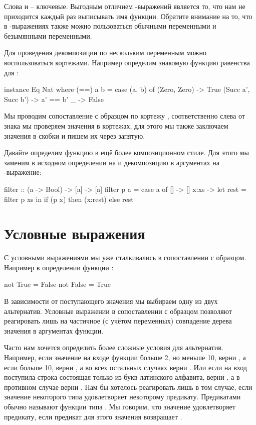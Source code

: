 Слова  и  -- ключевые. Выгодным отличием
-выражений является то, что нам не приходится
каждый раз выписывать имя функции. Обратите внимание
на то, что в -выражениях также можно пользоваться
обычными переменными и безымянными переменными.

Для проведения декомпозиции по нескольким переменным можно
воспользоваться кортежами. 
Например определим знакомую функцию равенства для :

\begin{code}
instance Eq Nat where
    (==) a b =
        case (a, b) of
            (Zero,    Zero)     -> True
            (Succ a', Succ b')  -> a' == b'
            _                   -> False
\end{code}

Мы проводим сопоставление с образцом по кортежу ,
соответственно слева от знака \In{->} мы проверяем значения в 
кортежах, для этого мы также заключаем значения в скобки
и пишем их через запятую.

Давайте определим функцию  в ещё более 
композиционном стиле. Для этого мы заменим в исходном 
определении  на  и декомпозицию в аргументах
на -выражение:

\begin{code}
filter :: (a -> Bool) -> [a] -> [a]
filter  p  a = 
    case a of
        []      -> []
        x:xs    ->  let rest = filter p xs
                    in  if (p x) 
                        then (x:rest)
                        else rest
\end{code}


\section{Условные выражения}

С условными выражениями мы уже сталкивались в сопоставлении с образцом.
Например в определении функции :

\begin{code}
not True  = False
not False = True
\end{code}

В зависимости от поступающего значения мы выбираем одну из двух
альтернатив. Условные выражении в сопоставлении с образцом позволяют
реагировать лишь на частичное (с учётом переменных) совпадение дерева
значения в аргументах функции. 

Часто нам хочется определить более сложные
условия для альтернатив. Например, если значение на входе функции
больше 2, но меньше 10, верни , а если больше 10, верни ,
а во всех остальных случаях верни . 
Или если на вход поступила строка состоящая только из букв
латинского алфавита, верни , а в противном случае верни
. Нам бы хотелось реагировать лишь в том случае, если значение 
некоторого типа  удовлетворяет некоторому предикату. 
Предикатами обычно называют функции типа .
Мы говорим, что значение удовлетворяет предикату, если предикат
для этого значения возвращает . 

